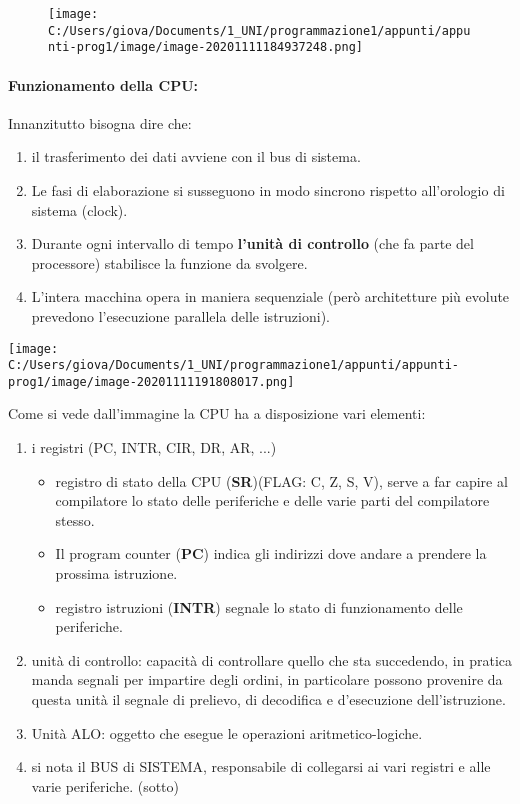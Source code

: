 \documentclass[
]{article}
\begin{document}
\begin{figure}
\centering
\texttt{[image: C:/Users/giova/Documents/1\_UNI/programmazione1/appunti/appunti-prog1/image/image-20201111184937248.png]}
\caption{}
\end{figure}

\hypertarget{header-n180}{%
\paragraph{Funzionamento della CPU:}\label{header-n180}}

Innanzitutto bisogna dire che:

\begin{enumerate}
\def\labelenumi{\arabic{enumi}.}
\item
  il trasferimento dei dati avviene con il bus di sistema.
\item
  Le fasi di elaborazione si susseguono in modo sincrono rispetto
  all'orologio di sistema (clock).
\item
  Durante ogni intervallo di tempo \textbf{l'unità di controllo} (che fa
  parte del processore) stabilisce la funzione da svolgere.
\item
  L'intera macchina opera in maniera sequenziale (però architetture più
  evolute prevedono l'esecuzione parallela delle istruzioni).
\end{enumerate}

\texttt{[image: C:/Users/giova/Documents/1\_UNI/programmazione1/appunti/appunti-prog1/image/image-20201111191808017.png]}

Come si vede dall'immagine la CPU ha a disposizione vari elementi:

\begin{enumerate}
\def\labelenumi{\arabic{enumi}.}
\item
  i registri (PC, INTR, CIR, DR, AR, ...)

  \begin{itemize}
  \item
    registro di stato della CPU (\textbf{SR})(FLAG: C, Z, S, V), serve a
    far capire al compilatore lo stato delle periferiche e delle varie
    parti del compilatore stesso.
  \item
    Il program counter (\textbf{PC}) indica gli indirizzi dove andare a
    prendere la prossima istruzione.
  \item
    registro istruzioni (\textbf{INTR}) segnale lo stato di
    funzionamento delle periferiche.
  \end{itemize}
\item
  unità di controllo: capacità di controllare quello che sta succedendo,
  in pratica manda segnali per impartire degli ordini, in particolare
  possono provenire da questa unità il segnale di prelievo, di
  decodifica e d'esecuzione dell'istruzione.
\item
  Unità ALO: oggetto che esegue le operazioni aritmetico-logiche.
\item
  si nota il BUS di SISTEMA, responsabile di collegarsi ai vari registri
  e alle varie periferiche. (sotto)
\end{enumerate}
\end{document}
